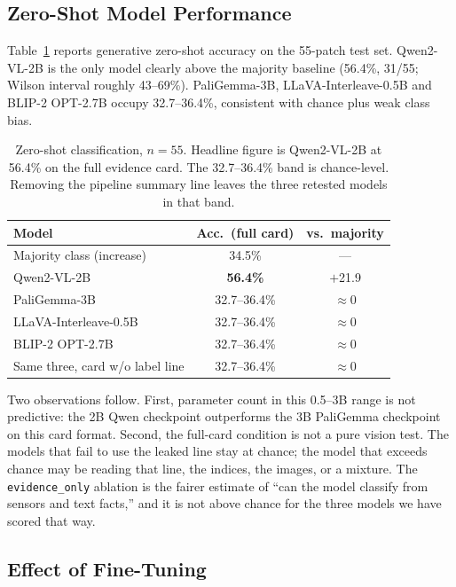 \documentclass[11pt]{article}
\begin{document}
\subsection{Zero-Shot Model Performance}

Table~\ref{tab:zeroshot} reports generative zero-shot accuracy on the
55-patch test set. Qwen2-VL-2B is the only model clearly above the
majority baseline (56.4\%, 31/55; Wilson interval roughly 43--69\%).
PaliGemma-3B, LLaVA-Interleave-0.5B and BLIP-2 OPT-2.7B occupy
32.7--36.4\%, consistent with chance plus weak class bias.

\begin{table}[t]
\centering
\small
\begin{tabular}{lcc}
\toprule
Model & Acc.\ (full card) & vs.\ majority \\
\midrule
Majority class (increase) & 34.5\% & --- \\
Qwen2-VL-2B & \textbf{56.4\%} & $+$21.9 \\
PaliGemma-3B & 32.7--36.4\% & $\approx 0$ \\
LLaVA-Interleave-0.5B & 32.7--36.4\% & $\approx 0$ \\
BLIP-2 OPT-2.7B & 32.7--36.4\% & $\approx 0$ \\
\midrule
Same three, card w/o label line & 32.7--36.4\% & $\approx 0$ \\
\bottomrule
\end{tabular}
\caption{Zero-shot classification, $n=55$. Headline figure is
Qwen2-VL-2B at 56.4\% on the full evidence card. The 32.7--36.4\%
band is chance-level. Removing the pipeline summary line leaves the
three retested models in that band.}
\label{tab:zeroshot}
\end{table}

Two observations follow. First, parameter count in this 0.5--3B
range is not predictive: the 2B Qwen checkpoint outperforms the 3B
PaliGemma checkpoint on this card format. Second, the full-card
condition is not a pure vision test. The models that fail to use the
leaked line stay at chance; the model that exceeds chance may be
reading that line, the indices, the images, or a mixture. The
\texttt{evidence\_only} ablation is the fairer estimate of ``can the
model classify from sensors and text facts,'' and it is not above
chance for the three models we have scored that way.

\subsection{Effect of Fine-Tuning}
\end{document}
